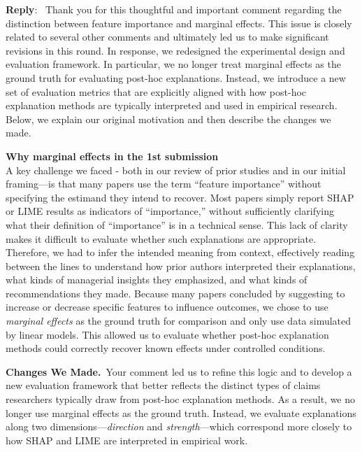 \documentclass[11pt]{article}
\newcounter{se}[section]
\newenvironment{reply}
 {\par\medskip \noindent \begin{sf}\textbf{Reply}:\ }
 {\medskip \end{sf}}
\begin{document}
\begin{reply}
Thank you for this thoughtful and important comment regarding the distinction between feature importance and marginal effects. This issue is closely related to several other comments and ultimately led us to make significant revisions in this round. In response, we redesigned the experimental design and evaluation framework. In particular, we no longer treat marginal effects as the ground truth for evaluating post-hoc explanations. Instead, we introduce a new set of evaluation metrics that are explicitly aligned with how post-hoc explanation methods are typically interpreted and used in empirical research. Below, we explain our original motivation and then describe the changes we made.

\noindent\textbf{Why marginal effects in the 1st submission}\\
A key challenge we faced - both in our review of prior studies and in our initial framing—is that many papers use the term “feature importance” without specifying the estimand they intend to recover. Most papers simply report SHAP or LIME results as indicators of “importance,” without sufficiently clarifying what their definition of “importance” is in a technical sense. This lack of clarity makes it difficult to evaluate whether such explanations are appropriate. Therefore, we had to infer the intended meaning from context, effectively reading between the lines to understand how prior authors interpreted their explanations, what kinds of managerial insights they emphasized, and what kinds of recommendations they made. Because many papers concluded by suggesting to increase or decrease specific features to influence outcomes, we chose to use \textit{marginal effects} as the ground truth for comparison and only use data simulated by linear models. %
This allowed us to evaluate whether post-hoc explanation methods could correctly recover known effects under controlled conditions. %

\noindent\textbf{Changes We Made.}\
Your comment led us to refine this logic and to develop a new evaluation framework that better reflects the distinct types of claims researchers typically draw from post-hoc explanation methods. As a result, we no longer use marginal effects as the ground truth. Instead, we evaluate explanations along two dimensions—\emph{direction} and \emph{strength}—which correspond more closely to how SHAP and LIME are interpreted in empirical work.


\end{reply}
\end{document}
